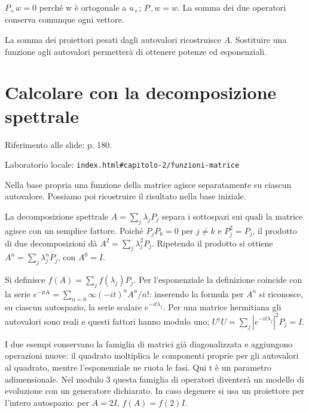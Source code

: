 
\(P_{+}w=0\) perché w è ortogonale a \(u_{+}\); \(P_{-}w=w\). La somma dei due operatori conserva comunque ogni vettore.\par


La somma dei proiettori pesati dagli autovalori ricostruisce \(A\). Sostituire una funzione agli autovalori permetterà di ottenere potenze ed esponenziali.\par


\Needspace{.43\textheight}
\section{Calcolare con la decomposizione spettrale}
\label{c2-funzioni-matrice}

{\sffamily\small\color{Ink!70} Riferimento alle slide: p. 180.\par}

{\sffamily\small\color{Ink!70} Laboratorio locale: \nolinkurl{index.html#capitolo-2/funzioni-matrice}\par}

Nella base propria una funzione della matrice agisce separatamente su ciascun autovalore. Possiamo poi ricostruire il risultato nella base iniziale.\par

La decomposizione spettrale \(A=\sum _{j}\lambda _{j}P_{j}\) separa i sottospazi sui quali la matrice agisce con un semplice fattore. Poiché \(P_{j}P_{k}=0\) per \(j\ne k\) e \(P_{j}^{2}=P_{j}\), il prodotto di due decomposizioni dà \(A^{2}=\sum _{j}\lambda _{j}^{2}P_{j}\). Ripetendo il prodotto si ottiene \(A^{n}=\sum _{j}\lambda _{j}^{n}P_{j}\), con \(A^{0}=I\).\par

Si definisce \(f(A)=\sum _{j}f(\lambda _{j})P_{j}\). Per l'esponenziale la definizione coincide con la serie \(e^{- \text{itA}}=\sum _{n=0}\infty (- it)^{n}A^{n}/n!\): inserendo la formula per \(A^{n}\) si riconosce, su ciascun autospazio, la serie scalare \(e^{- it\lambda _{j}}\). Per una matrice hermitiana gli autovalori sono reali e questi fattori hanno modulo uno; \(U{}^{\dagger} U=\sum _{j}|e^{- it\lambda _{j}}|^{2}P_{j}=I\).\par

I due esempi conservano la famiglia di matrici già diagonalizzata e aggiungono operazioni nuove: il quadrato moltiplica le componenti proprie per gli autovalori al quadrato, mentre l'esponenziale ne ruota le fasi. Qui t è un parametro adimensionale. Nel modulo 3 questa famiglia di operatori diventerà un modello di evoluzione con un generatore dichiarato. In caso degenere si usa un proiettore per l'intero autospazio: per \(A=2I\), \(f(A)=f(2)I\).\par


